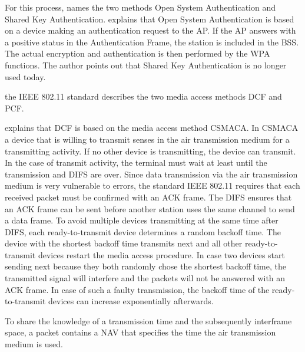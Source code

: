 \documentclass[]{nsm-thesis}
\begin{document}
For this process, \textcite{kauffels_wireless_2002} names the two methods Open System Authentication and Shared Key Authentication. \textcite{sauter_wireless_2022} explains that Open System Authentication is based on a device making an authentication request to the \ac{AP}. If the \ac{AP} answers with a positive status in the Authentication Frame, the station is included in the \ac{BSS}. The actual encryption and authentication is then performed by the \ac{WPA} functions. The author points out that Shared Key Authentication is no longer used today. 

 the IEEE 802.11 standard describes the two media access methods \ac{DCF} and \ac{PCF}.

\textcite{sauter_wireless_2022} explains that \ac{DCF} is based on the media access method \ac{CSMACA}. In \ac{CSMACA} a device that is willing to transmit senses in the air transmission medium for a transmitting activity. If no other device is transmitting, the device can transmit. In the case of transmit activity, the terminal must wait at least until the transmission and \ac{DIFS} are over.
Since data transmission via the air transmission medium is very vulnerable to errors, the standard IEEE 802.11 requires that each received packet must be confirmed with an \ac{ACK} frame.
The \ac{DIFS} ensures that an \ac{ACK} frame can be sent before another station uses the same channel to send a data frame. 
To avoid multiple devices transmitting at the same time after \ac{DIFS}, each ready-to-transmit device determines a random backoff time. The device with the shortest backoff time transmits next and all other ready-to-transmit devices restart the media access procedure. In case two devices start sending next because they both randomly chose the shortest backoff time, the transmitted signal will interfere and the packets will not be answered with an \ac{ACK} frame.
In case of such a faulty transmission, the backoff time of the ready-to-transmit devices can increase exponentially afterwards.

To share the knowledge of a transmission time and the subsequently interframe space, a packet contains a \ac{NAV} that specifies the time the air transmission medium is used.
\end{document}
